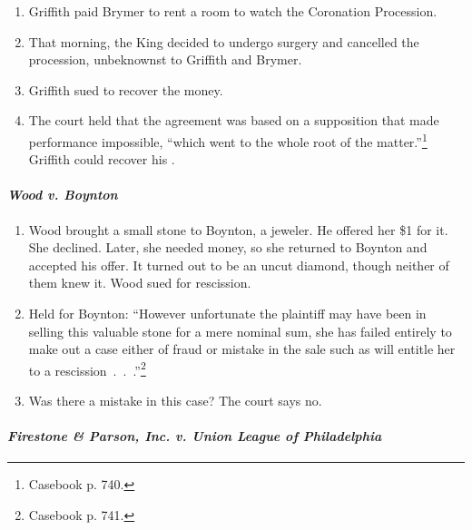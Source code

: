 \begin{enumerate}
    \item Griffith paid Brymer  to rent a room to watch the 
    Coronation Procession.
    \item That morning, the King decided to undergo surgery and cancelled the 
    procession, unbeknownst to Griffith and Brymer.
    \item Griffith sued to recover the money.
    \item The court held that the agreement was based on a supposition that 
    made performance impossible, ``which went to the whole root of the 
    matter.''\footnote{Casebook p. 740.} Griffith could recover his 
    .
\end{enumerate}

\paragraph{\emph{Wood v. Boynton}}

\begin{enumerate}
    \item Wood brought a small stone to Boynton, a jeweler. He offered her \$1 
    for it. She declined. Later, she needed money, so she returned to Boynton 
    and accepted his offer. It turned out to be an uncut diamond, though 
    neither of them knew it. Wood sued for rescission.
    \item Held for Boynton: ``However unfortunate the plaintiff may have been 
    in selling this valuable stone for a mere nominal sum, she has failed 
    entirely to make out a case either of fraud or mistake in the sale such as 
    will entitle her to a rescission~.~.~.''\footnote{Casebook p. 741.}
    \item Was there a mistake in this case? The court says no.
\end{enumerate}

\paragraph{\emph{Firestone \& Parson, Inc. v. Union League of Philadelphia}}

